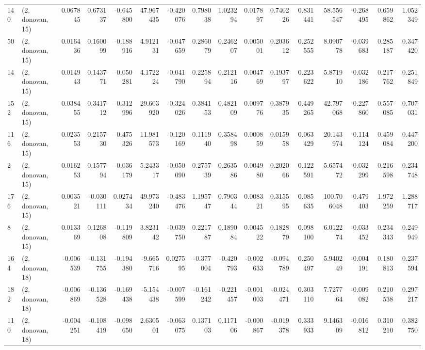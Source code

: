 \begin{tabular}{llrrrrrrrrrrrrrr}
140 &  (2, donovan, 15) &   0.067845 &  0.673137 & -0.645800 &    47.967435 &  -0.420076 &   0.798038 &   1.023294 &  0.017897 &  0.740226 &  0.831441 &   58.556547 & -0.268495 &  0.659862 &  1.052349 \\
50  &  (2, donovan, 15) &   0.016436 &  0.160099 & -0.188916 &     4.912131 &  -0.047659 &   0.286079 &   0.246207 &  0.005001 &  0.203612 &  0.252555 &    8.090778 & -0.039683 &  0.285187 &  0.347420 \\
14  &  (2, donovan, 15) &   0.014943 &  0.143771 & -0.050281 &     4.172224 &  -0.041790 &   0.225894 &   0.212116 &  0.004769 &  0.193797 &  0.223622 &    5.871910 & -0.032186 &  0.217762 &  0.251849 \\
152 &  (2, donovan, 15) &   0.038455 &  0.341712 & -0.312996 &    29.603920 &  -0.324026 &   0.384153 &   0.482109 &  0.009776 &  0.387935 &  0.449265 &   42.797068 & -0.227860 &  0.557085 &  0.707031 \\
116 &  (2, donovan, 15) &   0.023553 &  0.215730 & -0.475326 &    11.981573 &  -0.120169 &   0.111940 &   0.358498 &  0.000859 &  0.015958 &  0.063429 &   20.143974 & -0.114124 &  0.459084 &  0.447200 \\
2   &  (2, donovan, 15) &   0.016253 &  0.157794 & -0.036179 &     5.243317 &  -0.050090 &   0.275739 &   0.263586 &  0.004980 &  0.202066 &  0.122591 &    5.657472 & -0.032299 &  0.216598 &  0.234748 \\
176 &  (2, donovan, 15) &   0.003521 & -0.030111 &  0.027434 &    49.973240 &  -0.483476 &   1.195747 &   0.790344 &  0.008321 &  0.315595 &  0.085635 &  100.706048 & -0.479403 &  1.972259 &  1.288717 \\
8   &  (2, donovan, 15) &   0.013369 &  0.126808 & -0.119809 &     3.823142 &  -0.039750 &   0.221787 &   0.189084 &  0.004522 &  0.182879 &  0.098100 &    6.012274 & -0.033452 &  0.234343 &  0.249949 \\
164 &  (2, donovan, 18) &  -0.006539 & -0.131755 & -0.194380 &    -9.665716 &   0.027595 &  -0.377004 &  -0.420793 & -0.002633 & -0.094789 &  0.250497 &    5.940249 & -0.004191 &  0.180813 &  0.237594 \\
182 &  (2, donovan, 18) &  -0.006869 & -0.136528 & -0.169438 &    -5.154438 &  -0.007599 &  -0.161242 &  -0.221457 & -0.001003 & -0.024471 &  0.303110 &    7.727764 & -0.009082 &  0.210538 &  0.297217 \\
110 &  (2, donovan, 18) &  -0.004251 & -0.108419 & -0.098650 &     2.630501 &  -0.063075 &   0.137103 &   0.117106 & -0.000867 & -0.019378 &  0.333933 &    9.146309 & -0.016812 &  0.310210 &  0.382750 \\

\end{tabular}
